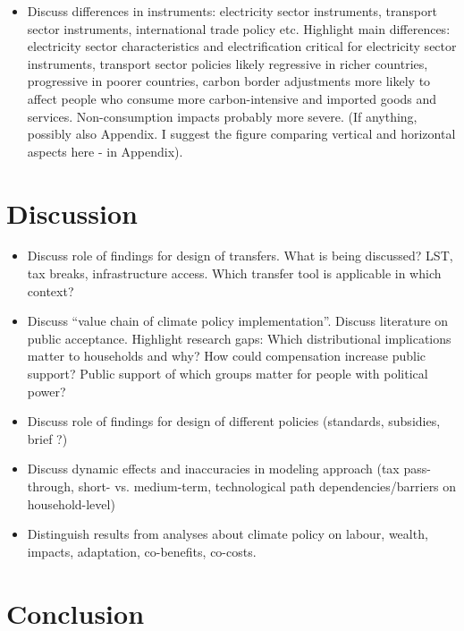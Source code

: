 \documentclass[12pt, a4paper]{article}
\begin{document}
\begin{itemize}
  \item Discuss differences in instruments: electricity sector instruments, transport sector instruments, international trade policy etc. Highlight main differences: electricity sector characteristics and electrification critical for electricity sector instruments, transport sector policies likely regressive in richer countries, progressive in poorer countries, carbon border adjustments more likely to affect people who consume more carbon-intensive and imported goods and services. Non-consumption impacts probably more severe. (If anything, possibly also Appendix. I suggest the figure comparing vertical and horizontal aspects here - in Appendix).
\end{itemize}

\section{Discussion} \label{sec:discussion}

\begin{itemize}
  \item Discuss role of findings for design of transfers. What is being discussed? LST, tax breaks, infrastructure access. Which transfer tool is applicable in which context?
\item Discuss ``value chain of climate policy implementation''. Discuss literature on public acceptance. Highlight research gaps: Which distributional implications matter to households and why? How could compensation increase public support? Public support of which groups matter for people with political power?
 \item Discuss role of findings for design of different policies (standards, subsidies, brief ?)
 \item Discuss dynamic effects and inaccuracies in modeling approach (tax pass-through, short- vs. medium-term, technological path dependencies/barriers on household-level)
 \item Distinguish results from analyses about climate policy on labour, wealth, impacts, adaptation, co-benefits, co-costs.
\end{itemize}

\section{Conclusion} \label{sec:conclusion}
\end{document}
